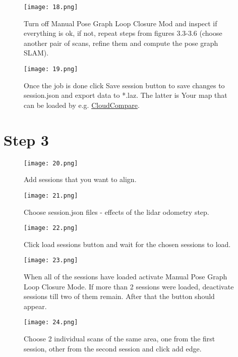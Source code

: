 \begin{figure}[H]
	\centering
	\texttt{[image: 18.png]}
	\caption{Turn off Manual Pose Graph Loop Closure Mod and inspect if everything is ok, if not,  repeat steps from figures 3.3-3.6 (choose another pair of scans, refine them and compute the pose graph SLAM).}
	\label{fig:18}
\end{figure}

\begin{figure}[H]
	\centering
	\texttt{[image: 19.png]}
	\caption{Once the job is done click Save session button to save changes to session.json and export data to *.laz. The latter is Your map that can be loaded by e.g. \href{https://www.cloudcompare.org/}{CloudCompare}.}
	\label{fig:19}
\end{figure}

\section{Step 3}
\begin{figure}[H]
	\centering
	\texttt{[image: 20.png]}
	\caption{Add sessions that you want to align.}
	\label{fig:20}
\end{figure}

\begin{figure}[H]
	\centering
	\texttt{[image: 21.png]}
	\caption{Choose session.json files - effects of the lidar odometry step.}
	\label{fig:21}
\end{figure}

\begin{figure}[H]
	\centering
	\texttt{[image: 22.png]}
	\caption{Click load sessions button and wait for the chosen sessions to load.}
	\label{fig:22}
\end{figure}

\begin{figure}[H]
	\centering
	\texttt{[image: 23.png]}
	\caption{When all of the sessions have loaded activate Manual Pose Graph Loop Closure Mode. If more than 2 sessions were loaded, deactivate sessions till two of them remain. After that the button should appear.}
	\label{fig:23}
\end{figure}

\begin{figure}[H]
	\centering
	\texttt{[image: 24.png]}
	\caption{Choose 2 individual scans of the same area, one from the first session, other from the second session and click add edge.}
	\label{fig:24}
\end{figure}

